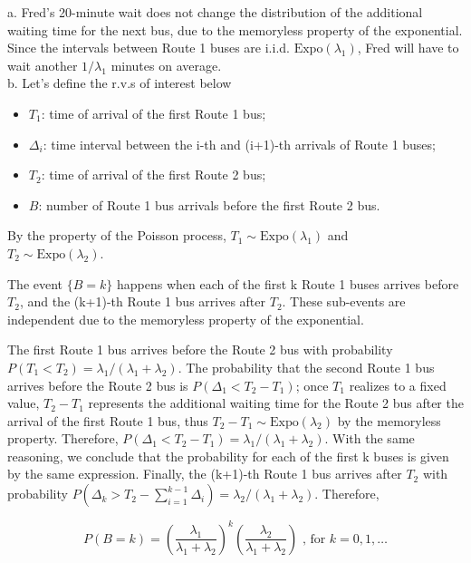a. Fred's 20-minute wait does not change the distribution of the additional waiting time for the next bus, due to the memoryless property of the exponential.
Since the intervals between Route 1 buses are i.i.d. $\mathrm{Expo}(\lambda_1)$, Fred will have to wait another $1/\lambda_1$ minutes on average. \\


b. Let's define the r.v.s of interest below

\begin{itemize}
\item $T_1$: time of arrival of the first Route 1 bus;

\item $\Delta_i$: time interval between the i-th and (i+1)-th arrivals of Route 1 buses;

\item $T_2$: time of arrival of the first Route 2 bus;

\item $B$: number of Route 1 bus arrivals before the first Route 2 bus.
\end{itemize}

By the property of the Poisson process, $T_1 \sim \mathrm{Expo}(\lambda_1)$ and\\ $T_2 \sim \mathrm{Expo}(\lambda_2)$.

The event $\{B=k\}$ happens when each of the first k Route 1 buses arrives before $T_2$, and the (k+1)-th Route 1 bus arrives after $T_2$.
These sub-events are independent due to the memoryless property of the exponential.

The first Route 1 bus arrives before the Route 2 bus with probability
$P(T_1 < T_2) = \lambda_1/(\lambda_1+\lambda_2)$.
The probability that the second Route 1 bus arrives before the Route 2 bus is $P(\Delta_1 < T_2 - T_1)$; once $T_1$ realizes to a fixed value, $T_2-T_1$ represents the additional waiting time for the Route 2 bus after the arrival of the first Route 1 bus, thus $T_2-T_1 \sim \mathrm{Expo}(\lambda_2)$ by the memoryless property. Therefore, $P(\Delta_1 < T_2 - T_1) = \lambda_1/(\lambda_1+\lambda_2)$.
With the same reasoning, we conclude that the probability for each of the first k buses is given by the same expression.
Finally, the (k+1)-th Route 1 bus arrives after $T_2$ with probability $P(\Delta_k > T_2 - \sum_{i=1}^{k-1} \Delta_i) = \lambda_2/(\lambda_1+\lambda_2)$.
Therefore,

$$
P(B=k) = \left( \frac{\lambda_1}{\lambda_1+\lambda_2} \right)^k \left( \frac{\lambda_2}{\lambda_1+\lambda_2} \right) \text{ , for } k = 0, 1, \dots
$$

